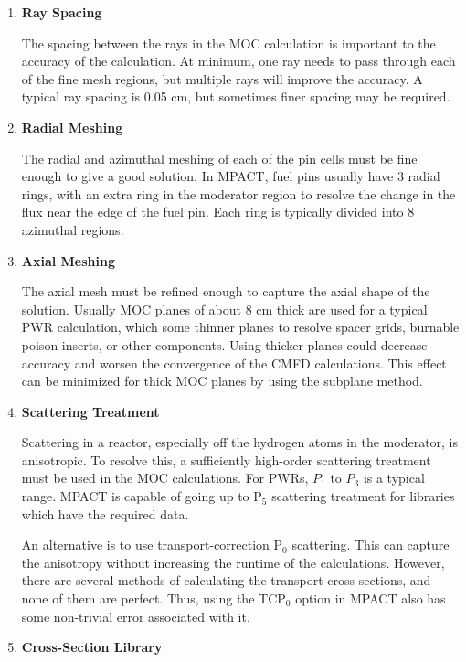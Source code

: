 \begin{enumerate}[leftmargin=*]
  \item \textbf{Ray Spacing}
  
  The spacing between the rays in the MOC calculation is important to the accuracy of the calculation.  At minimum, one ray needs to pass through each of the fine mesh regions, but multiple rays will improve the accuracy.  A typical ray spacing is 0.05 cm, but sometimes finer spacing may be required.
  
  \item \textbf{Radial Meshing}
  
  The radial and azimuthal meshing of each of the pin cells must be fine enough to give a good solution.  In MPACT, fuel pins usually have 3 radial rings, with an extra ring in the moderator region to resolve the change in the flux near the edge of the fuel pin.  Each ring is typically divided into 8 azimuthal regions.
  
  \item \textbf{Axial Meshing}
  
  The axial mesh must be refined enough to capture the axial shape of the solution.  Usually MOC planes of about 8 cm thick are used for a typical PWR calculation, which some thinner planes to resolve spacer grids, burnable poison inserts, or other components.  Using thicker planes could decrease accuracy and worsen the convergence of the CMFD calculations.  This effect can be minimized for thick MOC planes by using the subplane method.
  
  \item \textbf{Scattering Treatment}
  
  Scattering in a reactor, especially off the hydrogen atoms in the moderator, is anisotropic.  To resolve this, a sufficiently high-order scattering treatment must be used in the MOC calculations.  For PWRs, $P_1$ to $P_3$ is a typical range.  MPACT is capable of going up to P$_5$ scattering treatment for libraries which have the required data.
  
  An alternative is to use transport-correction P$_0$ scattering.  This can capture the anisotropy without increasing the runtime of the calculations.  However, there are several methods of calculating the transport cross sections, and none of them are perfect.  Thus, using the TCP$_0$ option in MPACT also has some non-trivial error associated with it.
  
  \item \textbf{Cross-Section Library}
  

\end{enumerate}
